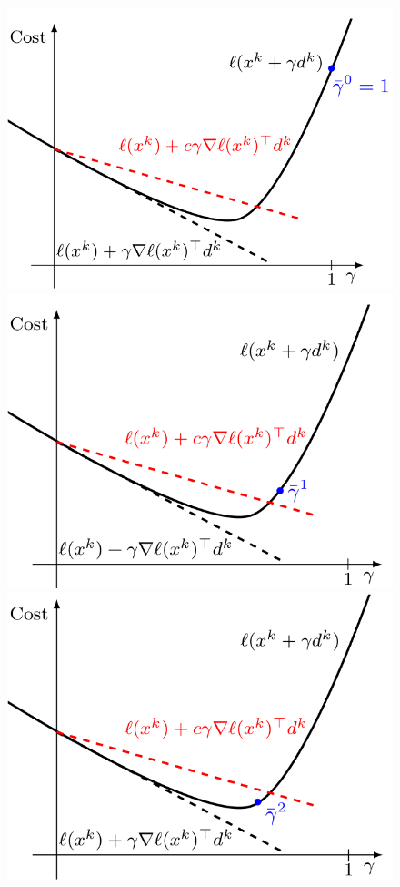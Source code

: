 \documentclass[openany]{book}
\theoremstyle{definition}
\theoremstyle{remark}
\begin{document}
\begin{figure}[ht]
    \centering
    \begin{minipage}{.33\textwidth}
        \centering
        \includegraphics[width=0.9\linewidth]{armijo0}
    \end{minipage}%
    \begin{minipage}{.33\textwidth}
        \centering
        \includegraphics[width=0.9\linewidth]{armijo1}
    \end{minipage}%
    \begin{minipage}{.33\textwidth}
        \centering
        \includegraphics[width=0.9\linewidth]{armijo2}

\end{minipage}
\end{figure}
\end{document}
